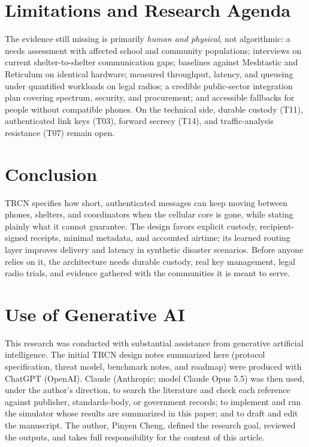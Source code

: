 \documentclass[jou,a4paper,11pt,floatsintext]{apa7}
\begin{document}
\section{Limitations and Research Agenda}

The evidence still missing is primarily \emph{human and physical}, not algorithmic: a needs assessment with affected school and community populations; interviews on current shelter-to-shelter communication gaps; baselines against Meshtastic and Reticulum on identical hardware; measured throughput, latency, and queueing under quantified workloads on legal radios; a credible public-sector integration plan covering spectrum, security, and procurement; and accessible fallbacks for people without compatible phones. On the technical side, durable custody (T11), authenticated link keys (T03), forward secrecy (T14), and traffic-analysis resistance (T07) remain open.

\section{Conclusion}

TRCN specifies how short, authenticated messages can keep moving between phones, shelters, and coordinators when the cellular core is gone, while stating plainly what it cannot guarantee. The design favors explicit custody, recipient-signed receipts, minimal metadata, and accounted airtime; its learned routing layer improves delivery and latency in synthetic disaster scenarios. Before anyone relies on it, the architecture needs durable custody, real key management, legal radio trials, and evidence gathered with the communities it is meant to serve.

\section*{Use of Generative AI}
This research was conducted with substantial assistance from generative artificial intelligence. The initial TRCN design notes summarized here (protocol specification, threat model, benchmark notes, and roadmap) were produced with ChatGPT (OpenAI). Claude (Anthropic; model Claude Opus 5.5) was then used, under the author's direction, to search the literature and check each reference against publisher, standards-body, or government records; to implement and run the simulator whose results are summarized in this paper; and to draft and edit the manuscript. The author, Pinyen Cheng, defined the research goal, reviewed the outputs, and takes full responsibility for the content of this article.

\printbibliography
\end{document}
